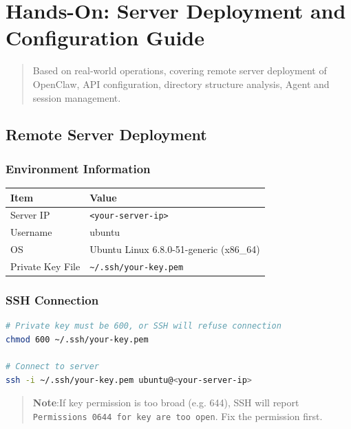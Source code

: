 \chapter{Hands-On: Server Deployment and Configuration Guide}

\begin{quote}
Based on real-world operations, covering remote server deployment of OpenClaw, API configuration, directory structure analysis, Agent and session management.
\end{quote}

\section{Remote Server Deployment}


\subsection{Environment Information}


\begin{table}[h]
\centering
\small
\begin{tabular}{|l|l|}
\hline
Item & Value \\
\hline
Server IP & \texttt{<your-server-ip>} \\
\hline
Username & ubuntu \\
\hline
OS & Ubuntu Linux 6.8.0-51-generic (x86\_64) \\
\hline
Private Key File & \texttt{\textasciitilde{}/.ssh/your-key.pem} \\
\hline
\end{tabular}
\end{table}

\subsection{SSH Connection}


\begin{lstlisting}[language=bash]
# Private key must be 600, or SSH will refuse connection
chmod 600 ~/.ssh/your-key.pem

# Connect to server
ssh -i ~/.ssh/your-key.pem ubuntu@<your-server-ip>
\end{lstlisting}

\begin{quote}
\textbf{Note}:If key permission is too broad (e.g. 644), SSH will report \texttt{Permissions 0644 for key are too open}. Fix the permission first.
\end{quote}

